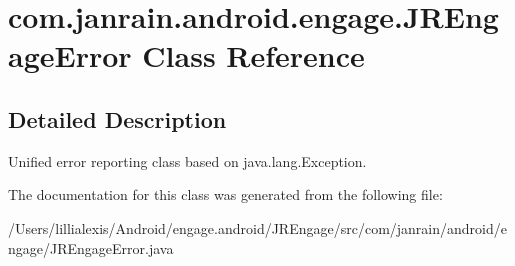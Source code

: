 \hypertarget{classcom_1_1janrain_1_1android_1_1engage_1_1_j_r_engage_error}{
\section{com.janrain.android.engage.JREngageError Class Reference}
\label{classcom_1_1janrain_1_1android_1_1engage_1_1_j_r_engage_error}
}


\subsection{Detailed Description}
Unified error reporting class based on java.lang.Exception. 

The documentation for this class was generated from the following file:\begin{DoxyCompactItemize}
\item 
/Users/lillialexis/Android/engage.android/JREngage/src/com/janrain/android/engage/JREngageError.java\end{DoxyCompactItemize}

